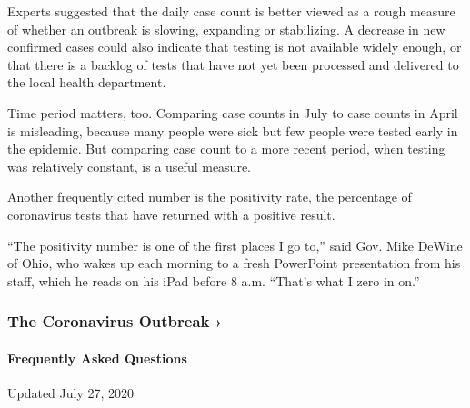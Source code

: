 Experts suggested that the daily case count is better viewed as a rough
measure of whether an outbreak is slowing, expanding or stabilizing. A
decrease in new confirmed cases could also indicate that testing is not
available widely enough, or that there is a backlog of tests that have
not yet been processed and delivered to the local health department.

Time period matters, too. Comparing case counts in July to case counts
in April is misleading, because many people were sick but few people
were tested early in the epidemic. But comparing case count to a more
recent period, when testing was relatively constant, is a useful
measure.

Another frequently cited number is the positivity rate, the percentage
of coronavirus tests that have returned with a positive result.

``The positivity number is one of the first places I go to,'' said Gov.
Mike DeWine of Ohio, who wakes up each morning to a fresh PowerPoint
presentation from his staff, which he reads on his iPad before 8 a.m.
``That's what I zero in on.''

\href{https://www.nytimes.com/news-event/coronavirus?action=click\&pgtype=Article\&state=default\&region=MAIN_CONTENT_3\&context=storylines_faq}{}

\hypertarget{the-coronavirus-outbreak-}{%
\subsubsection{The Coronavirus Outbreak
›}\label{the-coronavirus-outbreak-}}

\hypertarget{frequently-asked-questions}{%
\paragraph{Frequently Asked
Questions}\label{frequently-asked-questions}}

Updated July 27, 2020

